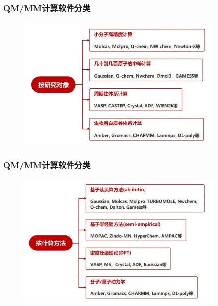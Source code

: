 \frame
{
	\frametitle{\textrm{QM/MM}计算软件分类}
\begin{figure}[h!]
\centering
\vspace{-5.0pt}
\includegraphics[height=2.60in,width=4.00in,viewport=0 0 959 629,clip]{Figures/QM_Softwares-1.jpeg}
\label{QM/MM-Softwares-1}
\end{figure}
}

\frame
{
	\frametitle{\textrm{QM/MM}计算软件分类}
\begin{figure}[h!]
\centering
\vspace{-5.0pt}
\includegraphics[height=2.60in,width=4.00in,viewport=0 0 992 638,clip]{Figures/QM_Softwares-2.jpeg}
\label{QM/MM-Softwares-2}
\end{figure}
}

